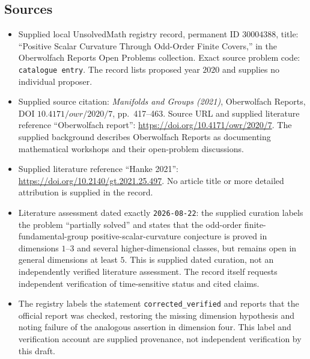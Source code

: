 \documentclass[11pt]{article}
\begin{document}
\subsection{Sources}
\begin{itemize}
\item Supplied local UnsolvedMath registry record, permanent ID \(30004388\), title: ``Positive Scalar Curvature Through Odd-Order Finite Covers,'' in the Oberwolfach Reports Open Problems collection. Exact source problem code: \texttt{catalogue entry}. The record lists proposed year \(2020\) and supplies no individual proposer.
\item Supplied source citation: \emph{Manifolds and Groups (2021)}, Oberwolfach Reports, DOI \(10.4171/owr/2020/7\), pp.~417--463. Source URL and supplied literature reference ``Oberwolfach report'': \url{https://doi.org/10.4171/owr/2020/7}. The supplied background describes Oberwolfach Reports as documenting mathematical workshops and their open-problem discussions.
\item Supplied literature reference ``Hanke 2021'': \url{https://doi.org/10.2140/gt.2021.25.497}. No article title or more detailed attribution is supplied in the record.
\item Literature assessment dated exactly \texttt{2026-08-22}: the supplied curation labels the problem ``partially solved'' and states that the odd-order finite-fundamental-group positive-scalar-curvature conjecture is proved in dimensions \(1\)--\(3\) and several higher-dimensional classes, but remains open in general dimensions at least \(5\). This is supplied dated curation, not an independently verified literature assessment. The record itself requests independent verification of time-sensitive status and cited claims.
\item The registry labels the statement \texttt{corrected\_verified} and reports that the official report was checked, restoring the missing dimension hypothesis and noting failure of the analogous assertion in dimension four. This label and verification account are supplied provenance, not independent verification by this draft.
\end{itemize}
\end{document}
